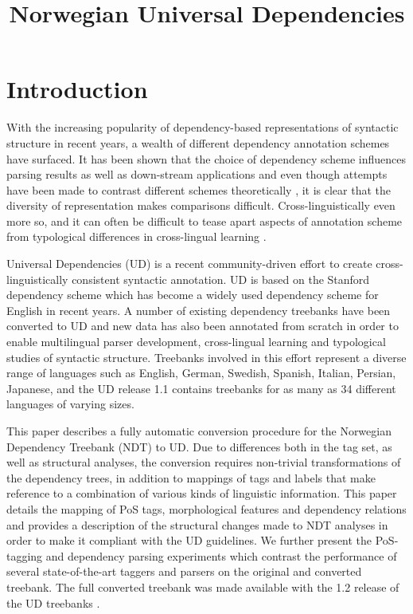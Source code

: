 \documentclass[10pt, a4paper]{article}
\title{Norwegian Universal Dependencies}
\date{}
\begin{document}
\maketitleabstract


\section{Introduction}
With the increasing popularity of dependency-based representations of
syntactic structure in recent years, a wealth of different dependency
annotation schemes have surfaced. It has been shown that the choice of
dependency scheme influences parsing results \cite{Sch:Abe:Rap:12} as
well as down-stream applications \cite{Elm:Joh:Kle:13} and even though
attempts have been made to contrast different schemes theoretically
\cite{Iva:Oep:Ovr:12}, it is clear that the diversity of
representation makes comparisons difficult. Cross-linguistically even
more so, and it can often be difficult to tease apart
aspects of annotation scheme from typological differences in cross-lingual learning \cite{Soe:11,Skj:Ovr:12}.

Universal Dependencies (UD) \cite{Mar:Doz:Sil:14,Niv:15} is a recent
community-driven effort to create cross-linguistically consistent
syntactic annotation. UD is based on the Stanford dependency scheme
\cite{Mar:Mac:Man:06} which has become a widely used dependency scheme
for English in recent years.  A number of existing dependency
treebanks have been converted to UD \cite{Pyy:Kan:Miss:15,Niv:14}
and new data has also been annotated from scratch in order to enable
multilingual parser development, cross-lingual learning and
typological studies of syntactic structure. Treebanks involved in this
effort represent a diverse range of languages such as English, German,
Swedish, Spanish, Italian, Persian, Japanese, and the UD release 1.1
contains treebanks for as many as 34 different languages of varying
sizes. 

This paper describes a fully automatic conversion procedure for the
Norwegian Dependency Treebank (NDT) to UD. Due to differences both in
the tag set, as well as structural analyses, the conversion requires
non-trivial transformations of the dependency trees, in addition to
mappings of tags and labels that make reference to a combination of
various kinds of linguistic information.  This paper details the
mapping of PoS tags, morphological features and dependency relations
and provides a description of the structural changes made to NDT
analyses in order to make it compliant with the UD guidelines. We
further present the PoS-tagging and dependency parsing experiments which
contrast the performance of several state-of-the-art taggers and
parsers on the original and converted treebank. The full converted
treebank was made available with the 1.2 release of the UD treebanks
\cite{Niv:Mar:Gin:16}.
\end{document}
